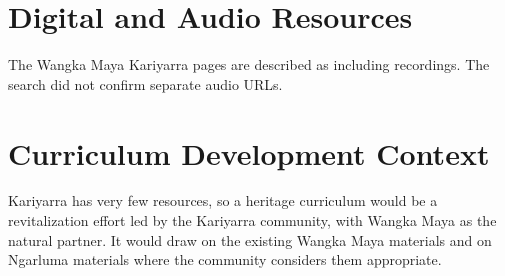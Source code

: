 \documentclass[12pt]{article}
\begin{document}
\section{Digital and Audio Resources}
The Wangka Maya Kariyarra pages are described as including recordings. The search did not confirm separate audio URLs.

\section{Curriculum Development Context}
Kariyarra has very few resources, so a heritage curriculum would be a revitalization effort led by the Kariyarra community, with Wangka Maya as the natural partner. It would draw on the existing Wangka Maya materials and on Ngarluma materials where the community considers them appropriate.
\end{document}
